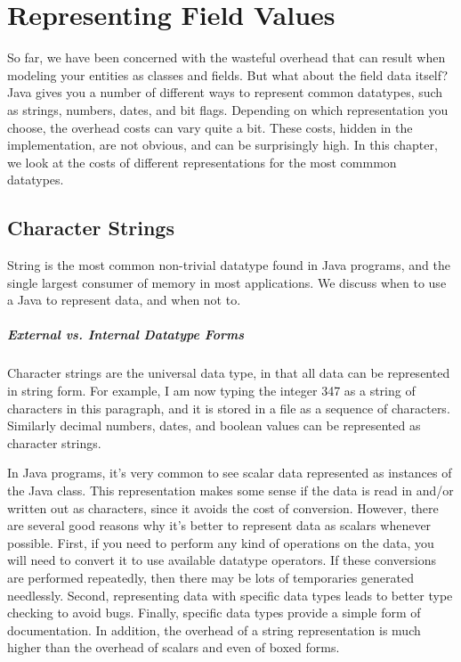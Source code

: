 \chapter{Representing Field Values}
\label{chapter:representing-values}

So far, we have been concerned with the wasteful overhead that can result when
modeling your entities as classes and fields. But what about the field data itself?
Java gives you a number of different ways to represent common datatypes, such
as strings, numbers, dates, and bit flags. Depending on which
representation you choose, the overhead costs can vary quite a bit. 
These costs, hidden in the implementation, are not obvious, and can be
surprisingly high.
In this chapter, we look at the costs of different representations for the most 
commmon datatypes.

\section{Character Strings}
String is the most common non-trivial datatype found in Java programs, and the single largest 
consumer of memory in most applications. We
discuss when to use a Java  to represent data, and when not to.
\paragraph{External vs. Internal Datatype Forms}
Character strings are the universal data type, in that all data can be
represented in string form.  For example, I am now typing the integer 347 as a
string of characters in this paragraph, and it is stored in a file as a sequence
of characters. Similarly decimal numbers, dates, and boolean values can be
represented as character strings.
 
In Java programs, it's very common to see scalar data represented as instances
of the Java  class. This representation makes some sense if the
data is read in and/or written out as characters, since it avoids the
cost of conversion. However, there are several good reasons why it's better
to represent data as scalars whenever possible. First, if you need to perform
any kind of operations on the data, you will need to convert it to use
available datatype operators. If these conversions are performed
repeatedly, then there may be lots of temporaries generated needlessly.  Second,
representing data with specific data types leads to better type checking to avoid bugs. 
Finally, specific data types provide a simple form of documentation.
In addition, the overhead of a string representation is much higher than
the overhead of scalars and even of boxed forms.

